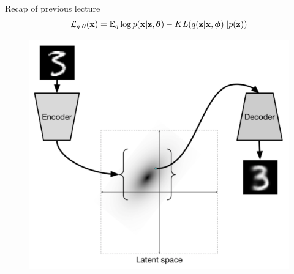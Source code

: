 \begin{frame}{Recap of previous lecture}
	\vspace{-0.3cm}
	\[
	 	\mathcal{L}_{q, \boldsymbol{\theta}}(\mathbf{x}) = \mathbb{E}_{q} \log p(\mathbf{x} | \mathbf{z}, \boldsymbol{\theta}) - KL (q(\mathbf{z} | \mathbf{x}, \boldsymbol{\phi}) || p(\mathbf{z}))
	\]
	\vspace{-0.5cm}
	\begin{minipage}[t]{0.6\columnwidth}
		\begin{figure}[h]
			\centering
			\includegraphics[width=\linewidth]{figs/VAE}
		\end{figure}
	\end{minipage}%
	\begin{minipage}[t]{0.4\columnwidth}
		\begin{figure}[h]
			\centering

\end{figure}
\end{minipage}
\end{frame}

